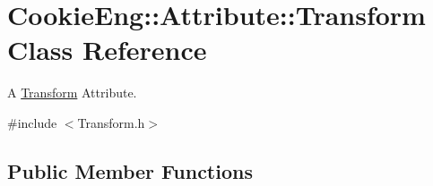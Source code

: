 \hypertarget{class_cookie_eng_1_1_attribute_1_1_transform}{}\section{Cookie\+Eng\+:\+:Attribute\+:\+:Transform Class Reference}
\label{class_cookie_eng_1_1_attribute_1_1_transform}


A \hyperlink{class_cookie_eng_1_1_attribute_1_1_transform}{Transform} Attribute.  




{\ttfamily \#include $<$Transform.\+h$>$}

\subsection*{Public Member Functions}
